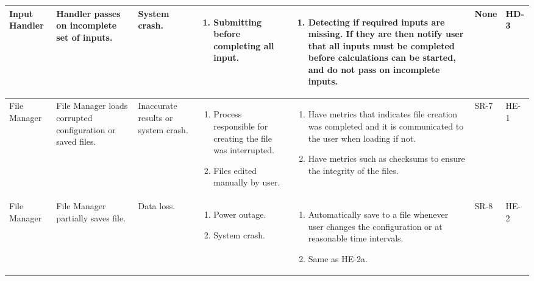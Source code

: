 \documentclass{article}
\begin{document}
\begin{landscape}
\begin{longtable}{|p{} | p{} | p{} | p{} | p{} | p{} | p{}|}
  \hline

  Input Handler & Handler passes on incomplete set of inputs. & System crash. &
  \begin{enumerate}[leftmargin=*, label={\alph*.}, itemsep=1pt, topsep=0pt, partopsep=0pt] 
    \item Submitting before completing all input.
  \end{enumerate} &
  \begin{enumerate}[leftmargin=*, label={\alph*.}, itemsep=1pt, topsep=0pt, partopsep=0pt] 
    \item Detecting if required inputs are missing. If they are then notify user that all inputs must be completed before calculations can be started, and do not pass on incomplete inputs.
  \end{enumerate} &
  None & HD-3 \\

  \hline

  File Manager & File Manager loads corrupted configuration or saved files. &
  Inaccurate results or system crash. &
  \begin{enumerate}[leftmargin=*, label={\alph*.}, itemsep=1pt, topsep=0pt, partopsep=0pt] 
    \item Process responsible for creating the file was interrupted.
    \item Files edited manually by user.
  \end{enumerate} &
  \begin{enumerate}[leftmargin=*, label={\alph*.}, itemsep=1pt, topsep=0pt, partopsep=0pt] 
    \item Have metrics that indicates file creation was completed and it is communicated to the user when loading if 
    not.
    \item Have metrics such as checksums to ensure the integrity of the files.  
  \end{enumerate} &
  SR-7 & HE-1 \\

  \hline

  File Manager & File Manager partially saves file. & Data loss. &
  \begin{enumerate}[leftmargin=*, label={\alph*.}, itemsep=1pt, topsep=0pt, partopsep=0pt] 
    \item Power outage.
    \item System crash.     
  \end{enumerate} &
  \begin{enumerate}[leftmargin=*, label={\alph*.}, itemsep=1pt, topsep=0pt, partopsep=0pt] 
    \item Automatically save to a file whenever user changes the configuration or at reasonable time intervals.
    \item Same as HE-2a.
  \end{enumerate} & 
  SR-8 & HE-2 \\


\end{longtable}
\end{landscape}
\end{document}
